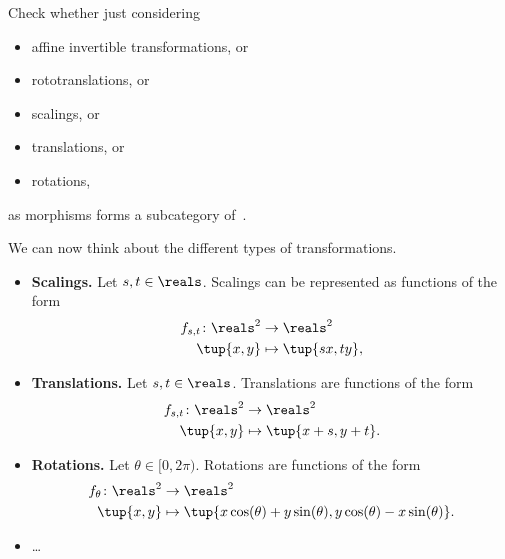 \begin{exercise}
    \label{ex:draw}
    Check whether just considering
    \begin{itemize}
        \item affine invertible transformations, or
        \item rototranslations, or
        \item scalings, or
        \item translations, or
        \item rotations,
    \end{itemize}
    as morphisms forms a subcategory of~\Draw.
\end{exercise}
\begin{solution}
    We can now think about the different types of transformations.
    \begin{itemize}
        \item \textbf{Scalings.}
              Let $s,t\in \reals$.
              Scalings can be represented as functions of the form
              \begin{equation*}
                  \begin{aligned}
                      f_{s,t}\colon \reals^2 & \to \reals^2           \\
                      \tup{x,y}              & \mapsto \tup{s x,t y},
                  \end{aligned}
              \end{equation*}
        \item \textbf{Translations.
              }
              Let $s,t\in \reals$.
              Translations are functions of the form
              \begin{equation*}
                  \begin{aligned}
                      f_{s,t}\colon \reals^2 & \to \reals^2           \\
                      \tup{x,y}              & \mapsto \tup{x+s,y+t}.
                  \end{aligned}
              \end{equation*}
        \item \textbf{Rotations.}
              Let $\theta \in [0,2\pi)$.
              Rotations are functions of the form
              \begin{equation*}
                  \begin{aligned}
                      f_{\theta}\colon \reals^2 & \to \reals^2                                                            \\
                      \tup{x,y}                 & \mapsto \tup{x\cos(\theta)+y\sin(\theta), y\cos(\theta)-x\sin(\theta)}.
                  \end{aligned}
              \end{equation*}
        \item \dots

    \end{itemize}
\end{solution}

